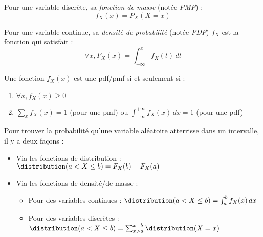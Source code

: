     \begin{definition}
        Pour une variable discrète, sa \textit{fonction de masse} (notée \textit{PMF}) :
        \[
            f_X(x) = P_X(X = x)
        \]

        Pour une variable continue, sa \textit{densité de probabilité} (notée \textit{PDF}) \(f_X\) est la fonction qui satisfait :
        \[
            \forall x, F_X(x) = \int_{-\infty}^{x} f_X(t)\,dt
        \]

        Une fonction \(f_X(x)\) est une pdf/pmf si et seulement si :
        \begin{enumerate}
            \item \(\forall x, f_X(x) \geq 0\)
            \item \(\sum_x f_X(x) = 1\) (pour une pmf) ou \(\int_{-\infty}^{+\infty} f_X(x)\,dx = 1\) (pour une pdf)
        \end{enumerate}
    \end{definition}

    Pour trouver la probabilité qu'une variable aléatoire atterrisse dans un intervalle, il y a deux façons :
    \begin{itemize}
        \item Via les fonctions de distribution : \(\distribution(a < X \leq b) = F_X(b) - F_X(a)\)
        \item Via les fonctions de densité/de masse :
        \begin{itemize}
            \item Pour des variables continues : \(\distribution(a < X \leq b) = \int_{a}^b f_X(x)\,dx\)
            \item Pour des variables discrètes : \(\distribution(a < X \leq b) = \sum_{x > a}^{x = b} \distribution(X = x)\)
        \end{itemize}
    \end{itemize}